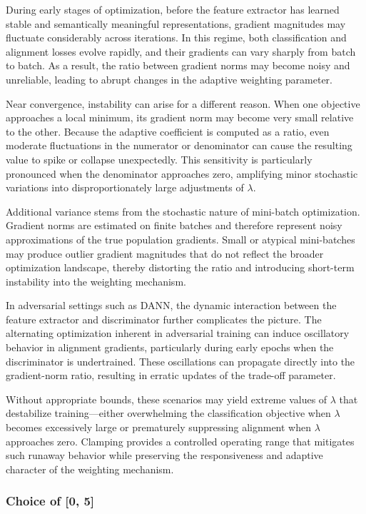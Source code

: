 \documentclass[pdflatex,sn-mathphys-num]{sn-jnl}
\theoremstyle{thmstyleone}
\theoremstyle{thmstyletwo}
\theoremstyle{thmstylethree}
\begin{document}
During early stages of optimization, before the feature extractor has learned stable and semantically meaningful representations, gradient magnitudes may fluctuate considerably across iterations. In this regime, both classification and alignment losses evolve rapidly, and their gradients can vary sharply from batch to batch. As a result, the ratio between gradient norms may become noisy and unreliable, leading to abrupt changes in the adaptive weighting parameter.

Near convergence, instability can arise for a different reason. When one objective approaches a local minimum, its gradient norm may become very small relative to the other. Because the adaptive coefficient is computed as a ratio, even moderate fluctuations in the numerator or denominator can cause the resulting value to spike or collapse unexpectedly. This sensitivity is particularly pronounced when the denominator approaches zero, amplifying minor stochastic variations into disproportionately large adjustments of $\lambda$.

Additional variance stems from the stochastic nature of mini-batch optimization. Gradient norms are estimated on finite batches and therefore represent noisy approximations of the true population gradients. Small or atypical mini-batches may produce outlier gradient magnitudes that do not reflect the broader optimization landscape, thereby distorting the ratio and introducing short-term instability into the weighting mechanism.

In adversarial settings such as DANN, the dynamic interaction between the feature extractor and discriminator further complicates the picture. The alternating optimization inherent in adversarial training can induce oscillatory behavior in alignment gradients, particularly during early epochs when the discriminator is undertrained. These oscillations can propagate directly into the gradient-norm ratio, resulting in erratic updates of the trade-off parameter.

Without appropriate bounds, these scenarios may yield extreme values of $\lambda$ that destabilize training—either overwhelming the classification objective when $\lambda$ becomes excessively large or prematurely suppressing alignment when $\lambda$ approaches zero. Clamping provides a controlled operating range that mitigates such runaway behavior while preserving the responsiveness and adaptive character of the weighting mechanism.


\subsubsection{Choice of [0, 5]}
\end{document}
